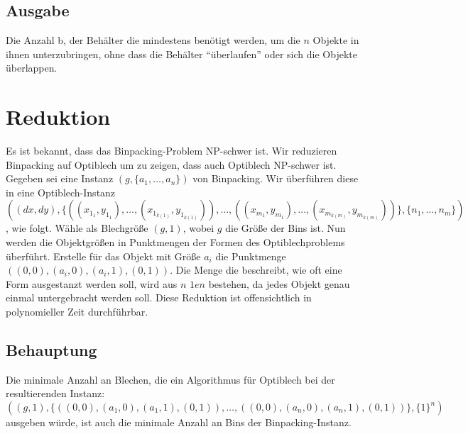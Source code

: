 \documentclass{scrartcl}
\begin{document}
\subsection*{Ausgabe}
Die Anzahl b, der Beh\"alter die mindestens ben\"otigt werden, um die $n$ Objekte in ihnen unterzubringen, ohne dass die Beh\"alter ``\"uberlaufen'' oder sich die Objekte \"uberlappen.

\section*{Reduktion}
Es ist bekannt, dass das Binpacking-Problem NP-schwer ist. Wir reduzieren Binpacking auf Optiblech um zu zeigen, dass auch Optiblech NP-schwer ist. 
Gegeben sei eine Instanz $(g, \{a_{1}, \ldots, a_{n}\})$ von Binpacking. Wir \"uberf\"uhren diese in eine Optiblech-Instanz\\ $((dx, dy), \{((x_{1_{1}}, y_{1_{1}}), \ldots , (x_{1_{k(1)}}, y_{1_{k(1)}})), \ldots , ((x_{m_{1}}, y_{m_{1}}), \ldots , (x_{m_{k(m)}}, y_{m_{k(m)}}))\}, \{n_{1}, \ldots, n_{m}\})$, wie folgt. W\"ahle als Blechgr\"o{\ss}e $(g, 1)$, wobei $g$ die Gr\"o{\ss}e der Bins ist. Nun werden die Objektgr\"o{\ss}en in Punktmengen der Formen des Optiblechproblems \"uberf\"uhrt. Erstelle f\"ur das Objekt mit Gr\"o{\ss}e $a_{i}$ die Punktmenge $((0, 0), (a_{i}, 0), (a_{i}, 1), (0, 1))$. Die Menge die beschreibt, wie oft eine Form ausgestanzt werden soll, wird aus $n$ $1en$ bestehen, da jedes Objekt genau einmal untergebracht werden soll. Diese Reduktion ist offensichtlich in polynomieller Zeit durchf\"uhrbar.

\subsection*{Behauptung}
Die minimale Anzahl an Blechen, die ein Algorithmus f\"ur Optiblech bei der resultierenden Instanz: $((g, 1), \{((0, 0), (a_{1}, 0), (a_{1}, 1), (0, 1)), \ldots, ((0, 0), (a_{n}, 0), (a_{n}, 1), (0, 1))\}, \{1\}^{n})$ ausgeben w\"urde, ist auch die minimale Anzahl an Bins der Binpacking-Instanz.
\end{document}
